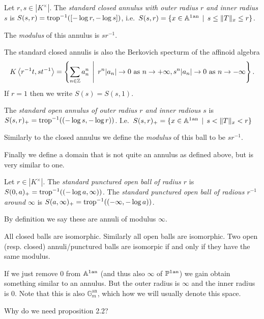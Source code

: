 \begin{definition}
	Let $r, s \in |K^{\times }|$. 
	The \emph{standard closed annulus with outer radius  $r$ and inner radius  $s$}  is $S(s, r) = \operatorname{trop}^{-1}([-\log r, -\log s])$, i.e.\ $S(s, r) = \{x \in \aff^{1}\an \st s \le \|T\|_x \le r\} $.

	The \emph{modulus} of this annulus is $s r^{-1}$. 
\end{definition}
The standard closed annulis is also the Berkovich specturm of the affinoid algebra \[
	K\left<r^{-1}t, st^{-1} \right> = \left\{\sum_{n \in \Z}^{} a_n ^{n} \st r^{n}|a_n| \to 0 \text{ as } n \to +\infty, s^n |a_n| \to 0 \text{ as } n \to - \infty\right\} 
.\] 
If $r = 1$ then we write $S(s) = S(s,1)$. 
\begin{definition}
	The \emph{standard open annulus of outer radius $r$ and inner radious $s$} is $S(s,r)_+ = \operatorname{trop}^{-1}((-\log s, -\log r))$. 
	I.e.\ $S(s,r)_+ = \{x \in \aff^{1}\an \st s < \|T\|_x < r\} $

	Similarly to the closed annulus we define the \emph{modulus} of this ball to be $s r^{-1}$. 
\end{definition}


Finally we define a domain that is not quite an annulus as defined above, but is very similar to one. 
\begin{definition}
	Let $r \in |K^{\times }|$. The \emph{standard punctured open ball of radius $r$ } is $S(0, a)_+ = \operatorname{trop}^{-1}((-\log a, \infty))$. 
	The \emph{standard punctured open ball of radious $r^{-1}$ around $\infty$} is $S(a, \infty)_+ = \operatorname{trop}^{-1}((-\infty, -\log a))$. 

	By definition we say these are annuli of modulus $\infty$. 
\end{definition}

All closed balls are isomorphic. Similarly all open balls are isomorphic. 
Two open (resp. closed) annuli/punctured balls are isomorpic if and only if they have the same modulus. 

\begin{remark}
	If we just remove $0$ from $\mathbb{A}^{1}{}^{\text{an}}$ (and thus also $\infty$ of $\mathbb{P}^{1}{}^{\text{an}}$) we gain obtain something similar to an annulus. But the outer radius is $\infty$ and the inner radius is $0$. 
	Note that this is also $\mathbb G^{\mathrm{an}}_m$, which how we will usually denote this space. 
\end{remark}



Why do we need proposition 2.2? 


